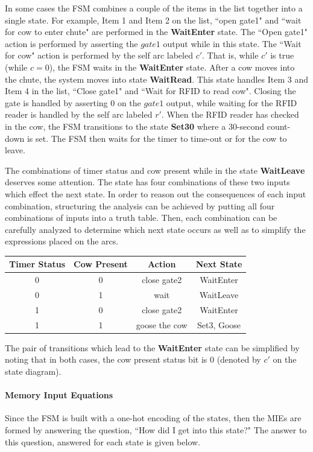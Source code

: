 In some cases the FSM combines a couple of the items
in the list together into a single state.  For example,
Item 1 and Item 2 on the list, ``open gate1" and ``wait for cow 
to enter chute" are performed in the {\bf WaitEnter} state.  The
``Open gate1" action is performed by asserting the $gate1$
output while in this state.  The ``Wait for cow" action is
performed by the self arc labeled $c'$.  That is, while $c'$ is
true (while $c=0$), the FSM waits in the {\bf WaitEnter} state.
After a cow moves into the chute, the system moves into state
{\bf WaitRead}.  This state handles Item 3 and Item 4 in the list, 
``Close gate1" and ``Wait for RFID to read cow".  Closing the gate
is handled by asserting 0 on the $gate1$ output, while
waiting for the RFID reader is handled by the self arc labeled
$r'$.  When the RFID reader has checked in the cow, the 
FSM transitions to the state {\bf  Set30} where a 30-second count-down is
set.  The FSM then waits for the timer to time-out or for
the cow to leave.

The combinations of timer status and cow present while in the 
state {\bf WaitLeave} deserves some attention. The state has four 
combinations of these two inputs which effect the next state.  
In order to reason out the consequences of each input 
combination, structuring the analysis can be achieved by putting all 
four combinations of inputs into a truth 
table.  Then, each combination can be carefully analyzed to 
determine which next state occurs as well as to simplify the
expressions placed on the arcs.

\begin{table}
\begin{tabular}{c|c||c|c}
Timer Status 	& Cow Present 	& Action		& Next State	\\ \hline \hline
0			& 0			& close gate2	& WaitEnter		\\ \hline
0			& 1			& wait		& WaitLeave		\\ \hline
1			& 0			& close gate2	& WaitEnter		\\ \hline
1			& 1			& goose the cow	& Set3, Goose		\\ 
\end{tabular}
\end{table}

The pair of transitions which lead to the {\bf WaitEnter} state can be
simplified by noting that in both cases, the cow present status
bit is 0 (denoted by $c'$ on the state diagram).

\paragraph{Memory Input Equations}
Since the FSM is built with a one-hot encoding of the states, 
then the MIEs are formed by answering the question, ``How did 
I get into this state?"  The answer to this question, answered 
for each state is given below.

